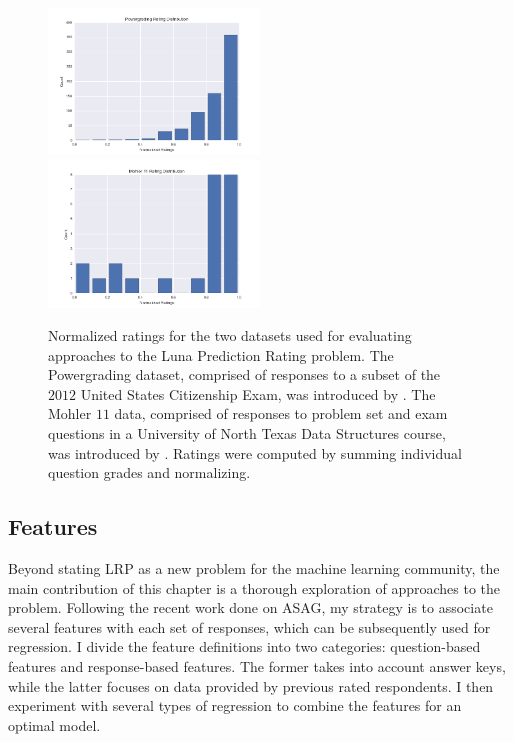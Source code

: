 \begin{figure}[h]
\centerline{%
\includegraphics[width=0.5\textwidth]{figures/powerGradingDistribution.png}%
\includegraphics[width=0.5\textwidth] {figures/mohlerRatings.png}%
}%
\caption{Normalized ratings for the two datasets used for evaluating approaches to the Luna Prediction Rating problem. The Powergrading dataset, comprised of responses to a subset of the $2012$ United States Citizenship Exam, was introduced by \citet{basu2013powergrading}. The Mohler $11$ data, comprised of responses to problem set and exam questions in a University of North Texas Data Structures course, was introduced by \citet{mohler2011learning}. Ratings were computed by summing individual question grades and normalizing.}
\label{fig:RatingDistribution}
\end{figure}

\subsection{Features}

Beyond stating LRP as a new problem for the machine learning community, the main contribution of this chapter is a thorough exploration of approaches to the problem. Following the recent work done on ASAG, my strategy is to associate several features with each set of responses, which can be subsequently used for regression. I divide the feature definitions into two categories: question-based features and response-based features. The former takes into account answer keys, while the latter focuses on data provided by previous rated respondents. I then experiment with several types of regression to combine the features for an optimal model.

